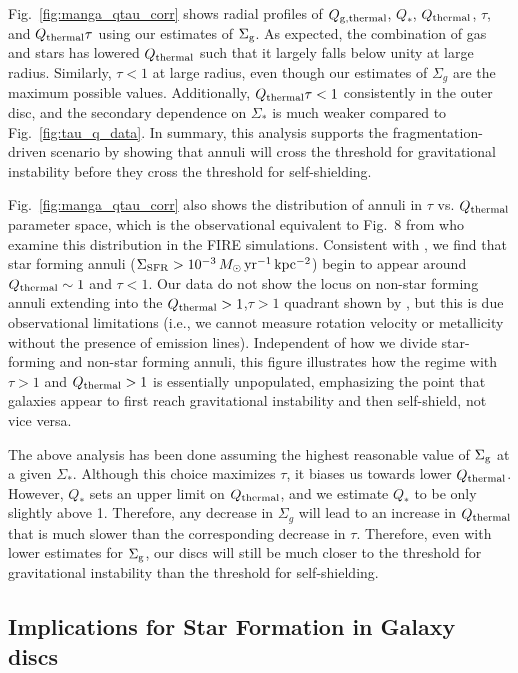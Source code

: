 \documentclass[fleqn,usenatbib]{mnras}
\newcommand{\qh}{Q_{\rm thermal}}
\newcommand{\qgh}{Q_{\rm g,thermal}}
\begin{document}
{Fig.~\ref{fig:manga_qtau_corr} shows radial profiles of $\qgh$, $Q_*$, $\qh$, $\tau$, and $\qh\tau$ using our estimates of $\Sigma_{\rm g}$.  As expected, the combination of gas and stars has lowered $\qh$ such that it largely falls below unity at large radius. Similarly, $\tau<1$ at large radius, even though our estimates of $\Sigma_g$ are the maximum possible values. Additionally, $\qh\tau<1$ consistently in the outer disc, and the secondary dependence on $\Sigma_*$ is much weaker compared to Fig.~\ref{fig:tau_q_data}.  In summary, this analysis supports the fragmentation-driven scenario by showing that annuli will cross the threshold for gravitational instability before they cross the threshold for self-shielding.

Fig.~\ref{fig:manga_qtau_corr} also shows the distribution of annuli in $\tau$ vs. $\qh$ parameter space, which is the observational equivalent to Fig.~8 from \citet{Orr17} who examine this distribution in the FIRE simulations. Consistent with \citet{Orr17}, we find that star forming annuli \mbox{($\Sigma_{\rm SFR}>10^{-3}\,M_{\odot}\,{\rm yr^{-1}\,kpc^{-2}}$)} begin to appear around $\qh\sim1$ and $\tau<1$. Our data do not show the locus on non-star forming annuli extending into the $\qh>1$,$\tau>1$ quadrant shown by \citet{Orr17}, but this is due observational limitations (i.e., we cannot measure rotation velocity or metallicity without the presence of emission lines). Independent of how we divide star-forming and non-star forming annuli, this figure illustrates how the regime with $\tau>1$ and $\qh>1$ is essentially unpopulated, emphasizing the point that galaxies appear to first reach gravitational instability and then self-shield, not vice versa.

The above analysis has been done assuming the highest reasonable value of $\Sigma_{\rm g}$ at a given $\Sigma_*$.  Although this choice maximizes $\tau$, it biases us towards lower $\qh$. However, $Q_*$ sets an upper limit on $\qh$, and we estimate $Q_*$ to be only slightly above 1.  Therefore, any decrease in $\Sigma_g$ will lead to an increase in $\qh$ that is much slower than the corresponding decrease in $\tau$.  Therefore, even with lower estimates for $\Sigma_{\rm g}$, our discs will still be much closer to the threshold for gravitational instability than the threshold for self-shielding.

\subsection{Implications for Star Formation in Galaxy discs}

}
\end{document}
